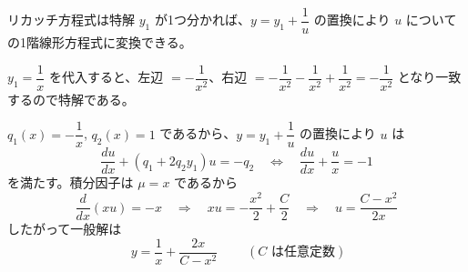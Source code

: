 
リカッチ方程式は特解 $y_{1}$ が1つ分かれば、$y = y_{1} + \dfrac{1}{u}$ の置換により $u$ についての1階線形方程式に変換できる。

$y_{1} = \dfrac{1}{x}$ を代入すると、左辺 $= -\dfrac{1}{x^{2}}$、右辺 $= -\dfrac{1}{x^{2}} - \dfrac{1}{x^{2}} + \dfrac{1}{x^{2}} = -\dfrac{1}{x^{2}}$ となり一致するので特解である。

$q_{1}(x) = -\dfrac{1}{x}$, $q_{2}(x) = 1$ であるから、$y = y_{1} + \dfrac{1}{u}$ の置換により $u$ は
\[
\frac{du}{dx} + \left(q_{1} + 2q_{2}y_{1}\right)u = -q_{2}
\quad\Longleftrightarrow\quad
\frac{du}{dx} + \frac{u}{x} = -1
\]
を満たす。積分因子は $\mu = x$ であるから
\[
\frac{d}{dx}(xu) = -x
\quad\Longrightarrow\quad
xu = -\frac{x^{2}}{2} + \frac{C}{2}
\quad\Longrightarrow\quad
u = \frac{C - x^{2}}{2x}
\]
したがって一般解は
\[
\boxed{\; y = \frac{1}{x} + \frac{2x}{C - x^{2}} \;}
\qquad (C \text{ は任意定数})
\]
